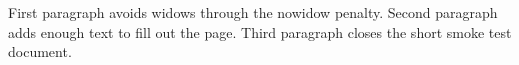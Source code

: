 \documentclass{article}
\begin{document}
First paragraph avoids widows through the nowidow penalty.
Second paragraph adds enough text to fill out the page.
Third paragraph closes the short smoke test document.
\end{document}
